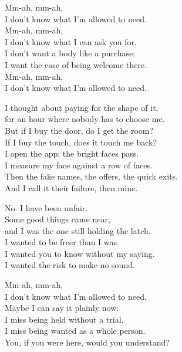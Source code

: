 \begin{lyrics}
Mm-ah, mm-ah,\\
I don't know what I'm allowed to need.\\
Mm-ah, mm-ah,\\
I don't know what I can ask you for.\\
I don't want a body like a purchase;\\
I want the ease of being welcome there.\\
Mm-ah, mm-ah,\\
I don't know what I'm allowed to need.

I thought about paying for the shape of it,\\
for an hour where nobody has to choose me.\\
But if I buy the door, do I get the room?\\
If I buy the touch, does it touch me back?\\
I open the app; the bright faces pass.\\
I measure my face against a row of faces.\\
Then the fake names, the offers, the quick exits.\\
And I call it their failure, then mine.

No. I have been unfair.\\
Some good things came near,\\
and I was the one still holding the latch.\\
I wanted to be freer than I was.\\
I wanted you to know without my saying.\\
I wanted the risk to make no sound.

Mm-ah, mm-ah,\\
I don't know what I'm allowed to need.\\
Maybe I can say it plainly now:\\
I miss being held without a trial.\\
I miss being wanted as a whole person.\\
You, if you were here, would you understand?
\end{lyrics}


